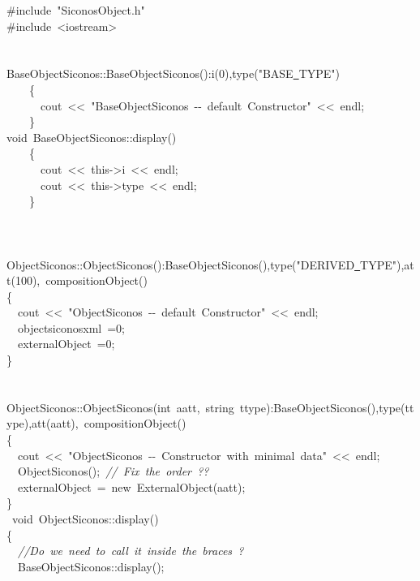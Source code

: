 {\ttfamily \raggedright \small
\#include\ "{}SiconosObject.h"{}\\
\#include\ <{}iostream>{}\\
\ \\
\ \\
BaseObjectSiconos::BaseObjectSiconos():i(0),type("{}BASE\underline\ TYPE"{})\\
\ \ \ \ \{\ \\
\ \ \ \ \ \ cout\ <{}<{}\ "{}BaseObjectSiconos\ -{}-{}\ default\ Constructor"{}\ <{}<{}\ endl;\\
\ \ \ \ \}\\
void\ BaseObjectSiconos::display()\\
\ \ \ \ \{\\
\ \ \ \ \ \ cout\ <{}<{}\ this-{}>{}i\ <{}<{}\ endl;\\
\ \ \ \ \ \ cout\ <{}<{}\ this-{}>{}type\ <{}<{}\ endl;\\
\ \ \ \ \}\\
\ \\
\ \\
\ \\
ObjectSiconos::ObjectSiconos():BaseObjectSiconos(),type("{}DERIVED\underline\ TYPE"{}),att(100),\ compositionObject()\\
\{\\
\ \ cout\ <{}<{}\ "{}ObjectSiconos\ -{}-{}\ default\ Constructor"{}\ <{}<{}\ endl;\\
\ \ objectsiconosxml\ =0;\\
\ \ externalObject\ =0;\\
\}\\
\ \\
\ \\
ObjectSiconos::ObjectSiconos(int\ aatt,\ string\ ttype):BaseObjectSiconos(),type(ttype),att(aatt),\ compositionObject()\\
\{\\
\ \ cout\ <{}<{}\ "{}ObjectSiconos\ -{}-{}\ Constructor\ with\ minimal\ data"{}\ <{}<{}\ endl;\\
\ \ ObjectSiconos();\ \textsl{//\ Fix\ the\ order\ ??}\\
\ \ externalObject\ =\ new\ ExternalObject(aatt);\\
\}\\
\ void\ ObjectSiconos::display()\\
\{\\
\ \ \textsl{//Do\ we\ need\ to\ call\ it\ inside\ the\ braces\ ?}\\
\ \ BaseObjectSiconos::display();\ \\
}
